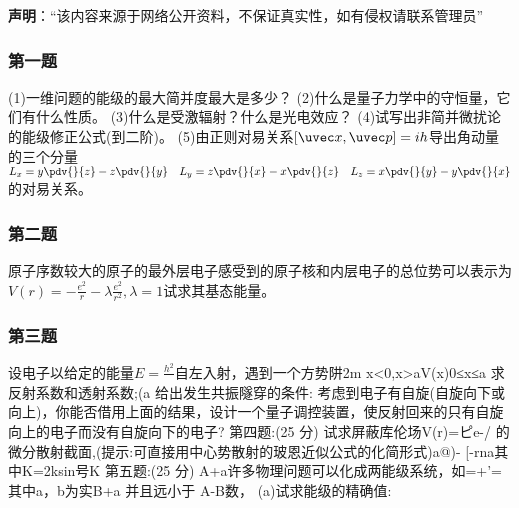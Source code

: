 


\textbf{声明}：“该内容来源于网络公开资料，不保证真实性，如有侵权请联系管理员”

\subsubsection{第一题}
(1)一维问题的能级的最大简并度最大是多少？
(2)什么是量子力学中的守恒量，它们有什么性质。
(3)什么是受激辐射？什么是光电效应？
(4)试写出非简并微扰论的能级修正公式(到二阶)。
(5)由正则对易关系$[\uvec x,\uvec p]=ih$导出角动量的三个分量$\displaystyle L_x=y\pdv{}{z}-z\pdv{}{y}  \quad L_y=z\pdv{}{x}-x\pdv{}{z} \quad L_z=x\pdv{}{y}-y\pdv{}{x}$
的对易关系。
\subsubsection{第二题}
原子序数较大的原子的最外层电子感受到的原子核和内层电子的总位势可以表示为$\displaystyle V(r)=-\frac{e^2}{r}-\lambda\frac{e^2}{r^2},\lambda=1$试求其基态能量。
\subsubsection{第三题}
设电子以给定的能量$E=\frac{h^2}{}$自左入射，遇到一个方势阱2m
x<0,x>aV(x)0≤x≤a
求反射系数和透射系数;(a
给出发生共振隧穿的条件:
考虑到电子有自旋(自旋向下或向上)，你能否借用上面的结果，设计一个量子调控装置，使反射回来的只有自旋向上的电子而没有自旋向下的电子?
第四题:(25 分)
试求屏蔽库伦场V(r)=ピe-/ 的微分散射截面,(提示:可直接用中心势散射的玻恩近似公式的化简形式)a@)- [-rna其中K=2ksin号K
第五题:(25 分)
A+a许多物理问题可以化成两能级系统，如=+'=其中a，b为实B+a
并且远小于 A-B数，
(a)试求能级的精确值: